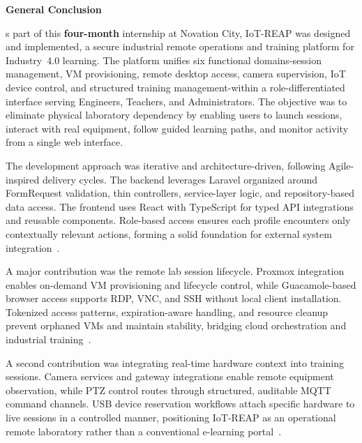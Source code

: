 {\huge\bfseries General Conclusion}

\vspace{1cm}

s part of this \textbf{four-month} internship at Novation City,
IoT-REAP was designed and implemented, a secure industrial remote operations and training
platform for Industry~4.0 learning. The platform unifies six functional domains-session
management, VM provisioning, remote desktop access, camera supervision, IoT device control,
and structured training management-within a role-differentiated interface serving Engineers,
Teachers, and Administrators. The objective was to eliminate physical laboratory dependency
by enabling users to launch sessions, interact with real equipment, follow guided learning
paths, and monitor activity from a single web interface.

The development approach was iterative and architecture-driven, following Agile-inspired
delivery cycles. The backend leverages Laravel organized around FormRequest validation,
thin controllers, service-layer logic, and repository-based data access. The frontend uses
React with TypeScript for typed API integrations and reusable components. Role-based access
ensures each profile encounters only contextually relevant actions, forming a solid foundation
for external system integration~{\footnotesize\cite{laravel-docs,react-docs,typescript-docs}}.

A major contribution was the remote lab session lifecycle. Proxmox integration enables
on-demand VM provisioning and lifecycle control, while Guacamole-based browser access
supports RDP, VNC, and SSH without local client installation. Tokenized access patterns,
expiration-aware handling, and resource cleanup prevent orphaned VMs and maintain stability,
bridging cloud orchestration and industrial training~{\footnotesize\cite{proxmox-ve-api,guacamole-manual}}.

A second contribution was integrating real-time hardware context into training sessions.
Camera services and gateway integrations enable remote equipment observation, while PTZ
control routes through structured, auditable MQTT command channels. USB device reservation
workflows attach specific hardware to live sessions in a controlled manner, positioning
IoT-REAP as an operational remote laboratory rather than a conventional e-learning
portal~{\footnotesize\cite{mqtt-oasis,usbip-docs}}.

